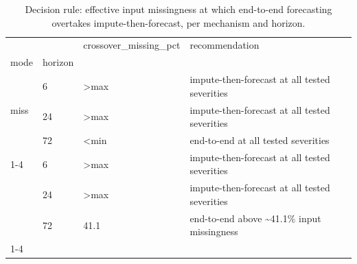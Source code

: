 \begin{table}
\caption{Decision rule: effective input missingness at which end-to-end forecasting overtakes impute-then-forecast, per mechanism and horizon.}
\label{tab:decision}
\begin{tabular}{llll}
\toprule
 &  & crossover\_missing\_pct & recommendation \\
mode & horizon &  &  \\
\midrule
\multirow[t]{3}{*}{miss} & 6 & >max & impute-then-forecast at all tested severities \\
 & 24 & >max & impute-then-forecast at all tested severities \\
 & 72 & <min & end-to-end at all tested severities \\
\cline{1-4}
\multirow[t]{3}{*}{out} & 6 & >max & impute-then-forecast at all tested severities \\
 & 24 & >max & impute-then-forecast at all tested severities \\
 & 72 & 41.1 & end-to-end above \textasciitilde 41.1\% input missingness \\
\cline{1-4}
\bottomrule
\end{tabular}
\end{table}
